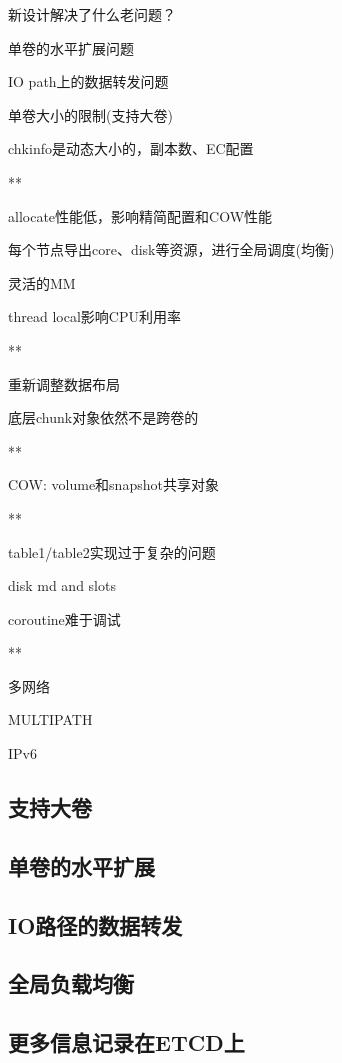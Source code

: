 新设计解决了什么老问题？
\begin{enumbox}
\item 单卷的水平扩展问题
\item IO path上的数据转发问题
\item 单卷大小的限制(支持大卷)
\item chkinfo是动态大小的，副本数、EC配置
\item ***
\item allocate性能低，影响精简配置和COW性能
\item 每个节点导出core、disk等资源，进行全局调度(均衡)
\item 灵活的MM
\item thread local影响CPU利用率
\item ***
\item 重新调整数据布局
\item 底层chunk对象依然不是跨卷的
\item ***
\item COW: volume和snapshot共享对象
\item ***
\item table1/table2实现过于复杂的问题
\item disk md and slots
\item coroutine难于调试
\item ***
\item 多网络
\item MULTIPATH
\item IPv6
\end{enumbox}

\subsection{支持大卷}

\subsection{单卷的水平扩展}

\subsection{IO路径的数据转发}

\subsection{全局负载均衡}

\subsection{更多信息记录在ETCD上}

